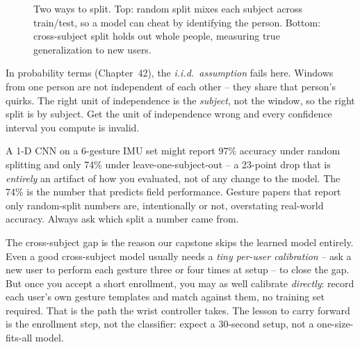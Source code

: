 \begin{figure}[H]
\centering
{}
\caption{Two ways to split. Top: random split mixes each subject across train/test, so a
model can cheat by identifying the person. Bottom: cross-subject split holds out whole
people, measuring true generalization to new users.}
\label{ch39:fig-cross-subject}
\end{figure}

\begin{connectionbox}
In probability terms (Chapter~42), the \emph{i.i.d.\ assumption} fails here. Windows
from one person are not independent of each other -- they share that person's quirks. The
right unit of independence is the \emph{subject}, not the window, so the right split is
by subject. Get the unit of independence wrong and every confidence interval you compute
is invalid.
\end{connectionbox}

\begin{example}
\label{ch39:ex-gap}
A 1-D CNN on a 6-gesture IMU set might report 97\% accuracy under random splitting and
only 74\% under leave-one-subject-out -- a 23-point drop that is \emph{entirely} an
artifact of how you evaluated, not of any change to the model. The 74\% is the number
that predicts field performance. Gesture papers that report only random-split numbers
are, intentionally or not, overstating real-world accuracy. Always ask which split a
number came from.
\end{example}

\begin{goalbox}
The cross-subject gap is the reason our capstone skips the learned model entirely. Even a
good cross-subject model usually needs a \emph{tiny per-user calibration} -- ask a new
user to perform each gesture three or four times at setup -- to close the gap. But once
you accept a short enrollment, you may as well calibrate \emph{directly}: record each
user's own gesture templates and match against them, no training set required. That is
the path the wrist controller takes. The lesson to carry forward is the enrollment step,
not the classifier: expect a 30-second setup, not a one-size-fits-all model.
\end{goalbox}

